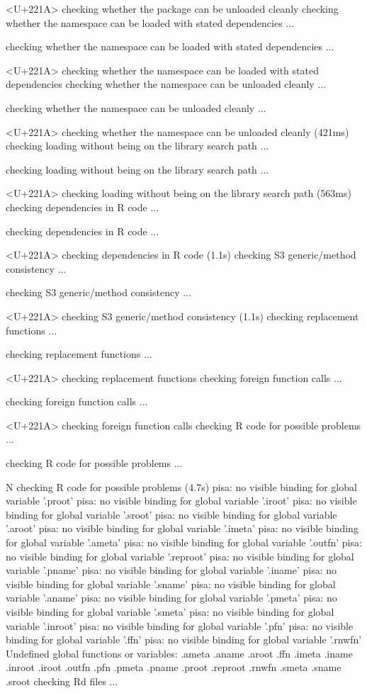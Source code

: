 \documentclass[a4paper,12pt]{article}\usepackage[]{graphicx}\usepackage[]{color}
\begin{document}
\begin{Schunk}
\begin{Soutput}
<U+221A>  checking whether the package can be unloaded cleanly
   checking whether the namespace can be loaded with stated dependencies ...
  
   checking whether the namespace can be loaded with stated dependencies ... 
  
<U+221A>  checking whether the namespace can be loaded with stated dependencies
   checking whether the namespace can be unloaded cleanly ...
  
   checking whether the namespace can be unloaded cleanly ... 
  
<U+221A>  checking whether the namespace can be unloaded cleanly (421ms)
   checking loading without being on the library search path ...
  
   checking loading without being on the library search path ... 
  
<U+221A>  checking loading without being on the library search path (563ms)
   checking dependencies in R code ...
  
   checking dependencies in R code ... 
  
<U+221A>  checking dependencies in R code (1.1s)
   checking S3 generic/method consistency ...
  
   checking S3 generic/method consistency ... 
  
<U+221A>  checking S3 generic/method consistency (1.1s)
   checking replacement functions ...
  
   checking replacement functions ... 
  
<U+221A>  checking replacement functions
   checking foreign function calls ...
  
   checking foreign function calls ... 
  
<U+221A>  checking foreign function calls
   checking R code for possible problems ...
  
   checking R code for possible problems ... 
  
N  checking R code for possible problems (4.7s)
   pisa: no visible binding for global variable '.proot'
   pisa: no visible binding for global variable '.iroot'
   pisa: no visible binding for global variable '.sroot'
   pisa: no visible binding for global variable '.aroot'
   pisa: no visible binding for global variable '.imeta'
   pisa: no visible binding for global variable '.ameta'
   pisa: no visible binding for global variable '.outfn'
   pisa: no visible binding for global variable '.reproot'
   pisa: no visible binding for global variable '.pname'
   pisa: no visible binding for global variable '.iname'
   pisa: no visible binding for global variable '.sname'
   pisa: no visible binding for global variable '.aname'
   pisa: no visible binding for global variable '.pmeta'
   pisa: no visible binding for global variable '.smeta'
   pisa: no visible binding for global variable '.inroot'
   pisa: no visible binding for global variable '.pfn'
   pisa: no visible binding for global variable '.ffn'
   pisa: no visible binding for global variable '.rnwfn'
   Undefined global functions or variables:
     .ameta .aname .aroot .ffn .imeta .iname .inroot .iroot .outfn .pfn
     .pmeta .pname .proot .reproot .rnwfn .smeta .sname .sroot
   checking Rd files ...
  

\end{Soutput}
\end{Schunk}
\end{document}
